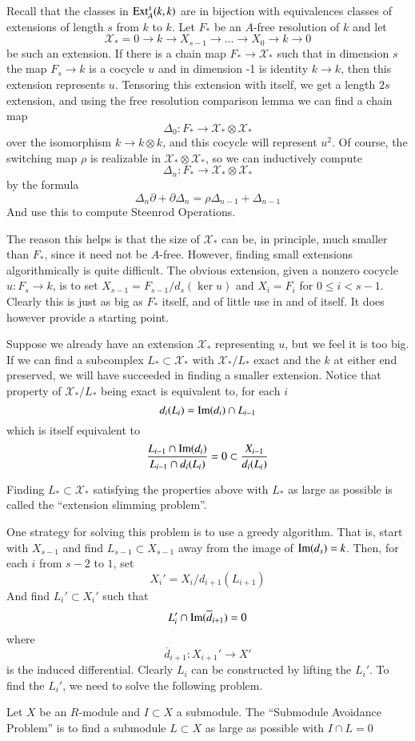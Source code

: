Recall that the classes in $\operatorname{Ext}\nolimits_A^s(k,k)$ are in bijection with equivalences classes of extensions of length $s$ from $k$ to $k$.
Let $F_*$ be an $A$-free resolution of $k$ and let
\[\mathcal{X}_*=0\to k \to X_{s-1}\to ...\to X_0\to k\to 0\]
 be such an extension.
If there is a chain map $F_*\to \mathcal{X}_*$ such that in dimension $s$ the map $F_s\to k$ is a cocycle $u$ and in dimension -1 is identity $k\to k$, then this extension represents $u$.
Tensoring this extension with itself, we get a length $2s$ extension, and using the free resolution comparison lemma we can find a chain map 
\[\Delta_0:F_*\to \mathcal{X}_*\otimes \mathcal{X}_*\]
over the isomorphism $k\to k\otimes k$, and this cocycle will represent $u^2$.
Of course, the switching map $\rho$ is realizable in $\mathcal{X}_*\otimes \mathcal{X}_*$, so we can inductively compute
\[\Delta_n : F_*\to \mathcal{X}_*\otimes \mathcal{X}_*\]
by the formula
\[\Delta_n\partial + \partial\Delta_n = \rho\Delta_{n-1}+\Delta_{n-1}\]
And use this to compute Steenrod Operations.

The reason this helps is that the size of $\mathcal{X}_*$ can be, in principle, much smaller than $F_*$, since it need not be $A$-free.
However, finding small extensions algorithmically is quite difficult.  
The obvious extension, given a nonzero cocycle $u:F_s\to k$, is to set $X_{s-1}=F_{s-1}/d_s(\ker u)$ and $X_i=F_i$ for $0 \le i < s-1$.  
Clearly this is just as big as $F_*$ itself, and of little use in and of itself.
It does however provide a starting point.

Suppose we already have an extension $\mathcal{X}_*$ representing $u$, but we feel it is too big.
If we can find a subcomplex $L_*\subset \mathcal{X}_*$ with $\mathcal{X}_*/L_*$ exact and the $k$ at either end preserved, we will have succeeded in finding a smaller extension.
Notice that property of $\mathcal{X}_*/L_*$ being exact is equivalent to, for each $i$
\[d_i(L_i) = \operatorname{Im}\nolimits(d_i)\cap L_{i-1}\]
which is itself equivalent to
\[\frac{L_{i-1}\cap \operatorname{Im}\nolimits(d_i)}{L_{i-1}\cap d_i(L_i)} = 0 \subset \frac{X_{i-1}}{d_i(L_i)}\]
\begin{Def}
  Finding $L_*\subset \mathcal{X}_*$ satisfying the properties above with $L_*$ as large as possible is called the ``extension slimming problem''.  
\end{Def}

One strategy for solving this problem is to use a greedy algorithm.
That is, start with $X_{s-1}$ and find $L_{s-1}\subset X_{s-1}$ away from the image of $\operatorname{Im}\nolimits(d_s)=k$.  Then, for each $i$ from $s-2$ to $1$, set
\[X_i'=X_i/d_{i+1}(L_{i+1})\]
And find $L_i'\subset X_i'$ such that
\[L_i'\cap \operatorname{Im}\nolimits(\overline{d}_{i+1}) = 0\]
where 
\[\overline{d}_{i+1}:X_{i+1}'\to X'\]
is the induced differential.  
Clearly $L_i$ can be constructed by lifting the $L_i'$.
To find the $L_i'$, we need to solve the following problem.  
\begin{Def}
  Let $X$ be an $R$-module and $I\subset X$ a submodule.
  The ``Submodule Avoidance Problem'' is to find a submodule $L\subset X$ as large as possible with $I\cap L=0$
\end{Def}

